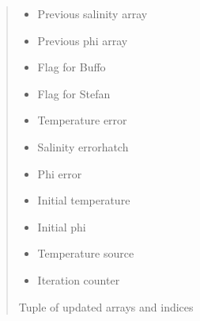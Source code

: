 \documentclass[a4paper,11pt,english,openany]{sphinxmanual}
\begin{document}
\begin{fulllineitems}
\begin{fulllineitems}
\begin{quote}
\begin{description}
\begin{itemize}
\item {} 
\sphinxAtStartPar
{} \textendash{} Previous salinity array

\item {} 
\sphinxAtStartPar
{} \textendash{} Previous phi array

\item {} 
\sphinxAtStartPar
{} \textendash{} Flag for Buffo

\item {} 
\sphinxAtStartPar
{} \textendash{} Flag for Stefan

\item {} 
\sphinxAtStartPar
{} \textendash{} Temperature error

\item {} 
\sphinxAtStartPar
{} \textendash{} Salinity errorhatch

\item {} 
\sphinxAtStartPar
{} \textendash{} Phi error

\item {} 
\sphinxAtStartPar
{} \textendash{} Initial temperature

\item {} 
\sphinxAtStartPar
{} \textendash{} Initial phi

\item {} 
\sphinxAtStartPar
{} \textendash{} Temperature source

\item {} 
\sphinxAtStartPar
{} \textendash{} Iteration counter

\end{itemize}

\sphinxAtStartPar
Tuple of updated arrays and indices

\end{description}\end{quote}

\end{fulllineitems}



\end{fulllineitems}
\end{document}
